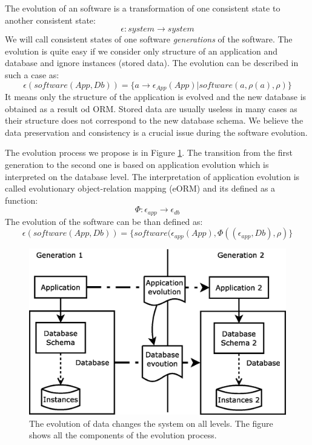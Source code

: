 \documentclass[11pt]{article}
\begin{document}
The evolution of an software is a transformation of one consistent state to another consistent state: $$\epsilon : system \rightarrow system $$ We will call consistent states of one software \emph{generations} of the software. The evolution is quite easy if we consider only structure of an application and database and ignore instances (stored data). The evolution can be described in such a case as:
\begin{equation*}
\epsilon(software(App, Db)) = \{a \rightarrow \epsilon_{App}(App)  | software(a, \rho(a), \rho)\}
\end{equation*}
It means only the structure of the application is evolved and the new database is obtained as a result od ORM. Stored data are usually useless in many cases as their structure does not correspond to the new database schema. We believe the data preservation and consistency is a crucial issue during the software evolution. 

The evolution process we propose is in Figure \ref{fig:evolution}. The transition from the first generation to the second one is based on application evolution which is interpreted on the database level. The interpretation of application evolution is called evolutionary object-relation mapping (eORM) and its defined as a function:
\begin{equation*}
	\Phi : \epsilon_{app} \rightarrow \epsilon_{db}
\end{equation*}
The evolution of the software can be than defined as:
\begin{equation*}
\epsilon(software(App, Db)) = \{software(\epsilon_{app}(App), \Phi((\epsilon_{app}, Db), \rho)\}
\end{equation*}


\begin{figure}
\begin{center}
	\includegraphics[scale=0.4]{./images/evolution_simple}
	\caption{The evolution of data changes the system on all levels. The figure shows all the components of the evolution process.}
\end{center}
	\label{fig:evolution}
\end{figure}
\end{document}
